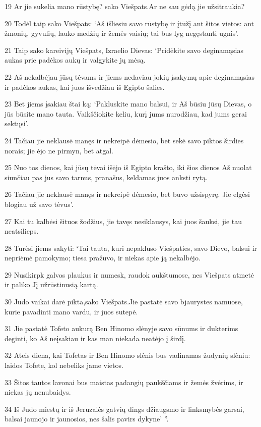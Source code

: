 \par 19 Ar jie sukelia mano rūstybę?­ sako Viešpats.­Ar ne sau gėdą jie užsitraukia? 
\par 20 Todėl taip sako Viešpats: ‘Aš išliesiu savo rūstybę ir įtūžį ant šitos vietos: ant žmonių, gyvulių, lauko medžių ir žemės vaisių; tai bus lyg negęstanti ugnis’. 
\par 21 Taip sako kareivijų Viešpats, Izraelio Dievas: ‘Pridėkite savo deginamąsias aukas prie padėkos aukų ir valgykite jų mėsą. 
\par 22 Aš nekalbėjau jūsų tėvams ir jiems nedaviau jokių įsakymų apie deginamąsias ir padėkos aukas, kai juos išvedžiau iš Egipto šalies. 
\par 23 Bet jiems įsakiau štai ką: ‘Pakluskite mano balsui, ir Aš būsiu jūsų Dievas, o jūs būsite mano tauta. Vaikščiokite keliu, kurį jums nurodžiau, kad jums gerai sektųsi’. 
\par 24 Tačiau jie neklausė manęs ir nekreipė dėmesio, bet sekė savo piktos širdies norais; jie ėjo ne pirmyn, bet atgal. 
\par 25 Nuo tos dienos, kai jūsų tėvai išėjo iš Egipto krašto, iki šios dienos Aš nuolat siunčiau pas jus savo tarnus, pranašus, keldamas juos anksti rytą. 
\par 26 Tačiau jie neklausė manęs ir nekreipė dėmesio, bet buvo užsispyrę. Jie elgėsi blogiau už savo tėvus’. 
\par 27 Kai tu kalbėsi šituos žodžius, jie tavęs nesiklausys, kai juos šauksi, jie tau neatsilieps. 
\par 28 Turėsi jiems sakyti: ‘Tai tauta, kuri nepakluso Viešpaties, savo Dievo, balsui ir nepriėmė pamokymo; tiesa pražuvo, ir niekas apie ją nekalbėjo. 
\par 29 Nusikirpk galvos plaukus ir numesk, raudok aukštumose, nes Viešpats atmetė ir paliko Jį užrūstinusią kartą. 
\par 30 Judo vaikai darė pikta,­sako Viešpats.­Jie pastatė savo bjaurystes namuose, kurie pavadinti mano vardu, ir juos sutepė. 
\par 31 Jie pastatė Tofeto aukurą Ben Hinomo slėnyje savo sūnums ir dukterims deginti, ko Aš neįsakiau ir kas man niekada neatėjo į širdį. 
\par 32 Ateis diena, kai Tofetas ir Ben Hinomo slėnis bus vadinamas žudynių slėniu: laidos Tofete, kol nebeliks jame vietos. 
\par 33 Šitos tautos lavonai bus maistas padangių paukščiams ir žemės žvėrims, ir niekas jų nenubaidys. 
\par 34 Iš Judo miestų ir iš Jeruzalės gatvių dings džiaugsmo ir linksmybės garsai, balsai jaunojo ir jaunosios, nes šalis pavirs dykyne’ ”.



